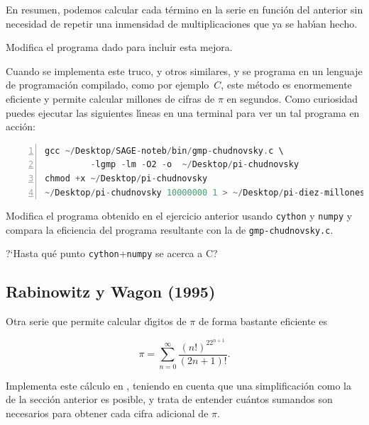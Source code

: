  En resumen, podemos calcular cada t\'ermino en la serie en
funci\'on del anterior sin necesidad de repetir una inmensidad de
multiplicaciones que ya se hab\'{\i}an hecho. 

\begin{ejer}

Modifica el programa dado para incluir esta mejora. 
\end{ejer}

Cuando se implementa  este truco, y otros similares,  y se programa en un lenguaje de
programaci\'on compilado, como por ejemplo~$C$, 
este m\'etodo es enormemente eficiente y permite calcular millones de cifras de
$\pi$ en segundos. Como curiosidad puedes
ejecutar las siguientes l\'{\i}neas en una terminal para ver un tal programa en
acci\'on:
\begin{lstlisting}[basicstyle=\color{black},language={C},backgroundcolor=\color{
LightYellow},numbers=left,linewidth=.99\textwidth]
gcc ~/Desktop/SAGE-noteb/bin/gmp-chudnovsky.c \
         -lgmp -lm -O2 -o  ~/Desktop/pi-chudnovsky 
chmod +x ~/Desktop/pi-chudnovsky
~/Desktop/pi-chudnovsky 10000000 1 > ~/Desktop/pi-diez-millones.txt
\end{lstlisting}

\begin{ejer}
	Modifica el programa obtenido en el ejercicio anterior usando \lstinline|cython| y \lstinline|numpy| y compara la eficiencia del programa resultante con la de {\tt gmp-chudnovsky.c}.
	
	?`Hasta qu\'e punto  \lstinline|cython|+\lstinline|numpy| se acerca a C?
	\end{ejer}




\subsection{Rabinowitz y  Wagon (1995)}


Otra serie que permite calcular d\'{\i}gitos de $\pi$ de forma bastante
eficiente es  


\[\pi=\sum_{n=0}^{\infty}\frac{(n!)^22^{n+1}}{(2n+1)!}.\]

\begin{ejer}

Implementa este c\'alculo en {\sage} , teniendo en cuenta que una
simplificaci\'on 
como la de la secci\'on anterior es posible, y trata de entender cu\'antos
sumandos son necesarios para obtener cada cifra adicional de $\pi$.
\end{ejer}




